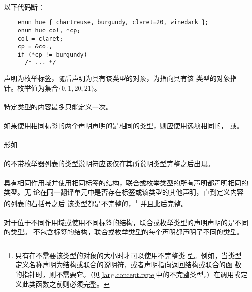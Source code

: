 {\paragraph{}
\ex* 以下代码断：
\begin{lstlisting}
    enum hue { chartreuse, burgundy, claret=20, winedark };
    enum hue col, *cp;
    col = claret;
    cp = &col;
    if (*cp != burgundy)
      /* ... */
\end{lstlisting}
声明为枚举标签，随后声明为具有该类型的对象，为指向具有该
类型的对象指针。枚举值为集合$\{0, 1, 20, 21\}$。


\constraint
\paragraph{}
特定类型的内容最多只能定义一次。

\paragraph{}
如果使用相同标签的两个声明声明的是相同的类型，则应使用选项相同的，
或。

\paragraph{}
形如                                                                          \\
\mbox{\hspace{4em} }                                  \\
的不带枚举器列表的类型说明符应该仅在其所说明类型完整之后出现。

\semantic
\paragraph{}
具有相同作用域并使用相同标签的结构，联合或枚举类型的所有声明都声明相同的类型。无
论在同一翻译单元中是否存在标签或该类型的其他声明，直到定义内容的列表的右括号之后
该类型都是不完整的，\footnote{只有在不需要该类型的对象的大小时才可以使用不完整类
型。例如，当类型定义名称声明为结构或联合的说明符，或者声明指向返回结构或联合的函
数的指针时，则不需要它。（见\ref{lang.concept.type}中的不完整类型。）在调用或定
义此类函数之前则必须完整。} 并且此后完整。

\paragraph{}
对于位于不同作用域或使用不同标签的结构，联合或枚举类型的声明声明的是不同的类型。
不包含标签的结构，联合或枚举类型的每个声明都声明了不同的类型。

}
